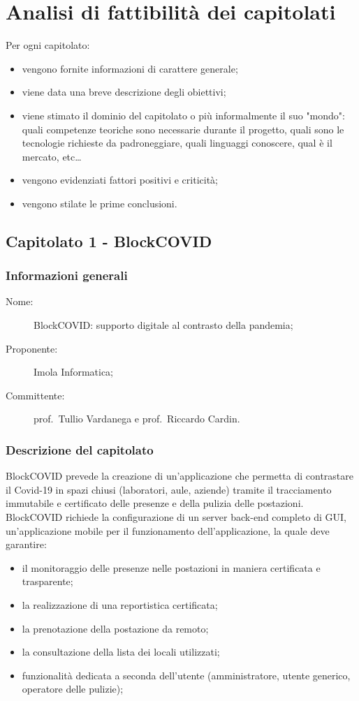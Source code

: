 \section{Analisi di fattibilità dei capitolati}
Per ogni capitolato:
\begin{itemize}
	\item vengono fornite informazioni di carattere generale;
	\item viene data una breve descrizione degli obiettivi;
	\item viene stimato il dominio del capitolato o più informalmente il suo "mondo": quali competenze teoriche sono necessarie durante il progetto, quali sono le tecnologie richieste da padroneggiare, quali linguaggi conoscere, qual è il mercato, etc\dots 
	\item vengono evidenziati fattori positivi e criticità;
	\item vengono stilate le prime conclusioni.
\end{itemize}

\subsection{Capitolato 1 - BlockCOVID}
\subsubsection{Informazioni generali}
\begin{description}
	\item[Nome:] BlockCOVID: supporto digitale al contrasto della pandemia;
	\item[Proponente:] Imola Informatica;
	\item[Committente:] prof.~Tullio Vardanega e prof.~Riccardo Cardin.
\end{description}
\subsubsection{Descrizione del capitolato}
BlockCOVID prevede la creazione di un'applicazione che permetta di contrastare il Covid-19 in spazi chiusi (laboratori, aule, aziende) tramite il tracciamento immutabile e certificato delle presenze e della pulizia delle postazioni.
BlockCOVID richiede la configurazione di un server back-end completo di GUI, un'applicazione mobile per il funzionamento dell'applicazione, la quale deve garantire:
\begin{itemize}
\item il monitoraggio delle presenze nelle postazioni in maniera certificata e trasparente;
\item la realizzazione di una reportistica certificata;
\item la prenotazione della postazione da remoto;
\item la consultazione della lista dei locali utilizzati;
\item funzionalità dedicata a seconda dell'utente (amministratore, utente generico, operatore delle pulizie);
\end{itemize}
